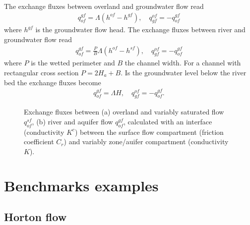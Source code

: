 The exchange fluxes between overland and groundwater flow read
%
\begin{eqnarray}
q_{of}^{gf} = \Lambda \left( h^{of} - h^{gf} \right),\quad q_{gf}^{of} = - q_{of}^{gf}
\label{eqn:CoupFlux4}
\end{eqnarray}
%
where $h^{gf}$ is the groundwater flow head.
%
The exchange fluxes between river and groundwater flow read
%
\begin{eqnarray}
q_{of}^{gf} =  \frac{P}{B}  \Lambda \left( h^{of} - h^{sf} \right),\quad q_{gf}^{of} = - q_{of}^{gf}
\label{eqn:CoupFlux2}
\end{eqnarray}
%
where $P$ is the wetted perimeter and $B$ the channel width. For a channel with rectangular cross section $P = 2 H_a + B$.
Is the groundwater level below the river bed the exchange fluxes become
%
\begin{eqnarray}
q_{of}^{gf} =  \Lambda H,\quad q_{gf}^{of} = - q_{of}^{gf}.
\label{eqn:CoupFlux3}
\end{eqnarray}
%
%
\begin{figure} [htb!]
 \centering
 \caption{Exchange fluxes between (a) overland and variably saturated flow $q_{of}^{sf}$, (b) river and aquifer flow $q_{of}^{gf}$, calculated with an interface (conductivity $K^c$) between the surface flow compartment (friction coefficient $C_r$) and variably zone/auifer compartment (conductivity $K$).}
 \label{coup:exchangeFluxes}
\end{figure}
%
%
\section{Benchmarks examples}

\subsection{Horton flow}
\label{sec:CoupWoolhiser}
%
